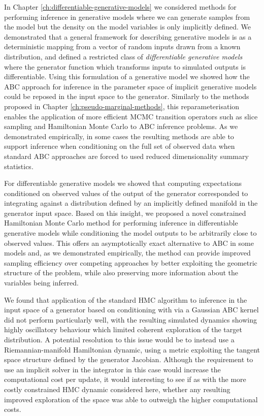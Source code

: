 In Chapter \ref{ch:differentiable-generative-models} we considered methods for performing inference in generative models where we can generate samples from the model but the density on the model variables is only implicitly defined. We demonstrated that a general framework for describing generative models is as a deterministic mapping from a vector of random inputs drawn from a known distribution, and defined a restricted class of \emph{differentiable generative models} where the generator function which transforms inputs to simulated outputs is differentiable. Using this formulation of a generative model we showed how the \acf{ABC} approach for inference in the parameter space of implicit generative models could be reposed in the input space to the generator. Similarly to the methods proposed in Chapter \ref{ch:pseudo-marginal-methods}, this reparameterisation enables the application of more efficient \ac{MCMC} transition operators such as slice sampling and Hamiltonian Monte Carlo to \ac{ABC} inference problems. As we demonstrated empirically, in some cases the resulting methods are able to support inference when conditioning on the full set of observed data when standard \ac{ABC} approaches are forced to used reduced dimensionality summary statistics.

For differentiable generative models we showed that computing expectations conditioned on observed values of the output of the generator corresponded to integrating against a distribution defined by an implicitly defined manifold in the generator input space. Based on this insight, we proposed a novel constrained Hamiltonian Monte Carlo method for performing inference in differentiable generative models while conditioning the model outputs to be arbitrarily close to observed values. This offers an asymptotically exact alternative to \ac{ABC} in some models and, as we demonstrated empirically, the method can provide improved sampling efficiency over competing approaches by better exploiting the geometric structure of the problem, while also preserving more information about the variables being inferred.

We found that application of the standard \ac{HMC} algorithm to inference in the input space of a generator based on conditioning with via a Gaussian \ac{ABC} kernel did not perform particularly well, with the resulting simulated dynamics showing highly oscillatory behaviour which limited coherent exploration of the target distribution. A potential resolution to this issue would be to instead use a Riemannian-manifold Hamiltonian dynamic, using a metric exploiting the tangent space structure defined by the generator Jacobian. Although the requirement to use an implicit solver in the integrator in this case would increase the computational cost per update, it would interesting to see if as with the more costly constrained \ac{HMC} dynamic considered here, whether any resulting improved exploration of the space was able to outweigh the higher computational costs.

